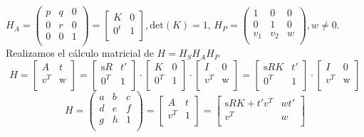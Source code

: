 \documentclass[12pt,a4paper]{article}
\begin{document}
	$H_A=\begin{pmatrix}
	p & q & 0\\
	0 & r & 0\\
	0 & 0 & 1 \\ 
	\end{pmatrix}=\begin{bmatrix}
	K & 0 \\
	0^t & 1\\
	\end{bmatrix}, \text{det}(K)=1$,\newline
	$H_P = \begin{pmatrix}
	1 & 0 & 0\\
	0 & 1 & 0\\
	v_1 & v_2 & w \\ 
	\end{pmatrix}, w\ne 0$. 
	\newline\newline
	Realizamos el cálculo matricial de $H=H_SH_AH_P$ 
	$$
	H=\begin{bmatrix}
		A & t\\
		v^T & \text{w}\\
	\end{bmatrix} = \begin{bmatrix}
	\text{s}R & t'\\
	0^T & \text{1}\\
	\end{bmatrix}\cdot\begin{bmatrix}
	K & 0\\
	0^T & \text{1}\\
	\end{bmatrix}\cdot\begin{bmatrix}
	I & 0\\
	v^T & \text{w}\\
	\end{bmatrix}=\begin{bmatrix}
	\text{s} RK & t'\\
	0^T & \text{1}\\
	\end{bmatrix}\cdot\begin{bmatrix}
	I & 0\\
	v^T & \text{w}\\
	\end{bmatrix}
	$$
	$$ H=\begin{pmatrix}
	a & b & c\\
	d & e & f\\
	g & h & 1\\
	\end{pmatrix} = \begin{bmatrix}
	A & t\\
	v^T & \text{1}\\
	\end{bmatrix}=\begin{bmatrix}
	\text{s} RK + t'v^T & wt'\\
	v^T & w\\
	\end{bmatrix}$$
\end{document}
